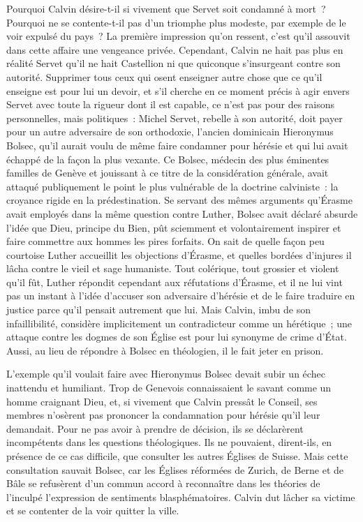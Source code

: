 \documentclass[french,twoside]{book} %
\newcommand{\astermono}{\medskip\centerline{\color{rubric}\large\selectfont{\syms ✻}}\medskip\par}%
\begin{document}
\astermono

\noindent Pourquoi Calvin désire-t-il si vivement que Servet soit condamné à mort ? Pourquoi ne se contente-t-il pas d’un triomphe plus modeste, par exemple de le voir expulsé du pays ? La première impression qu’on ressent, c’est qu’il assouvit dans cette affaire une vengeance privée. Cependant, Calvin ne hait pas plus en réalité Servet qu’il ne hait Castellion ni que quiconque s’insurgeant contre son autorité. Supprimer tous ceux qui osent enseigner autre chose que ce qu’il enseigne est pour lui un devoir, et s’il cherche en ce moment précis à agir envers Servet avec toute la rigueur dont il est capable, ce n’est pas pour des raisons personnelles, mais politiques : Michel Servet, rebelle à son autorité, doit payer pour un autre adversaire de son orthodoxie, l’ancien dominicain Hieronymus Bolsec, qu’il aurait voulu de même faire condamner pour hérésie et qui lui avait échappé de la façon la plus vexante. Ce Bolsec, médecin des plus éminentes familles de Genève et jouissant à ce titre de la considération générale, avait attaqué publiquement le point le plus vulnérable de la doctrine calviniste : la croyance rigide en la prédestination. Se servant des mêmes arguments qu’Érasme avait employés dans la même question contre Luther, Bolsec avait déclaré absurde l’idée que Dieu, principe du Bien, pût sciemment et volontairement inspirer et faire commettre aux hommes les pires forfaits. On sait de quelle façon peu courtoise Luther accueillit les objections d’Érasme, et quelles bordées d’injures il lâcha contre le vieil et sage humaniste. Tout colérique, tout grossier et violent qu’il fût, Luther répondit cependant aux réfutations d’Érasme, et il ne lui vint pas un instant à l’idée d’accuser son adversaire d’hérésie et de le faire traduire en justice parce qu’il pensait autrement que lui. Mais Calvin, imbu de son infaillibilité, considère implicitement un contradicteur comme un hérétique ; une attaque contre les dogmes de son Église est pour lui synonyme de crime d’État. Aussi, au lieu de répondre à Bolsec en théologien, il le fait jeter en prison.\par
L’exemple qu’il voulait faire avec Hieronymus Bolsec devait subir un échec inattendu et humiliant. Trop de Genevois connaissaient le savant comme un homme craignant Dieu, et, si vivement que Calvin pressât le Conseil, ses membres n’osèrent pas prononcer la condamnation pour hérésie qu’il leur demandait. Pour ne pas avoir à prendre de décision, ils se déclarèrent incompétents dans les questions théologiques. Ils ne pouvaient, dirent-ils, en présence de ce cas difficile, que consulter les autres Églises de Suisse. Mais cette consultation sauvait Bolsec, car les Églises réformées de Zurich, de Berne et de Bâle se refusèrent d’un commun accord à reconnaître dans les théories de l’inculpé l’expression de sentiments blasphématoires. Calvin dut lâcher sa victime et se contenter de la voir quitter la ville.\par
\end{document}
